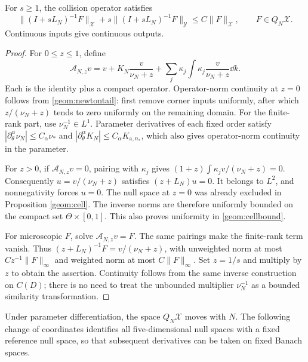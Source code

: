 \begin{proposition}\label{geom:resolvent}
For $s\ge1$, the collision operator satisfies
\begin{equation}\label{geom:resolventbound}
 \|(I+sL_N)^{-1}F\|_{\mathcal X}
   +s\|(I+sL_N)^{-1}F\|_{\mathcal Y}\le C\|F\|_{\mathcal X},
 \qquad F\in Q_N\mathcal X.
\end{equation}
Continuous inputs give continuous outputs.
\end{proposition}
\begin{proof}
For $0\le z\le1$, define
\[
 \mathcal A_{N,z}v=v+K_N\frac v{\nu_N+z}
        +\sum_j\kappa_j\int\kappa_j\frac v{\nu_N+z}\dd k.
\]
Each is the identity plus a compact operator.
Operator-norm continuity at $z=0$ follows from \eqref{geom:newtontail}:
first remove corner inputs uniformly, after which
$z/(\nu_N+z)$ tends to zero uniformly on the remaining domain.
For the finite-rank part, use $\nu_N^{-1}\in L^1$.
Parameter derivatives of each fixed order satisfy
$|\partial_\theta^\alpha\nu_N|\le C_\alpha\nu_*$ and
$|\partial_\theta^\alpha K_N|\le C_\alpha K_{\mathrm a,n_*}$,
which also gives operator-norm continuity in the parameter.

For $z>0$, if $\mathcal A_{N,z}v=0$, pairing with $\kappa_j$ gives
$(1+z)\int\kappa_jv/(\nu_N+z)=0$.
Consequently $u=v/(\nu_N+z)$ satisfies $(z+L_N)u=0$.
It belongs to $L^2$, and nonnegativity forces $u=0$.
The null space at $z=0$ was already excluded in Proposition \ref{geom:cell}.
The inverse norms are therefore uniformly bounded on the compact set
$\Theta\times[0,1]$. This also proves uniformity in \eqref{geom:cellbound}.

For microscopic $F$, solve $\mathcal A_{N,z}v=F$.
The same pairings make the finite-rank term vanish. Thus
$(z+L_N)^{-1}F=v/(\nu_N+z)$, with unweighted norm at most
$Cz^{-1}\|F\|_\infty$ and weighted norm at most $C\|F\|_\infty$.
Set $z=1/s$ and multiply by $z$ to obtain the assertion.
Continuity follows from the same inverse construction on $C(D)$;
there is no need to treat the unbounded multiplier $\nu_N^{-1}$
as a bounded similarity transformation.
\end{proof}

Under parameter differentiation, the space $Q_N\mathcal X$ moves with $N$.
The following change of coordinates identifies all five-dimensional
null spaces with a fixed reference null space, so that subsequent
derivatives can be taken on fixed Banach spaces.

